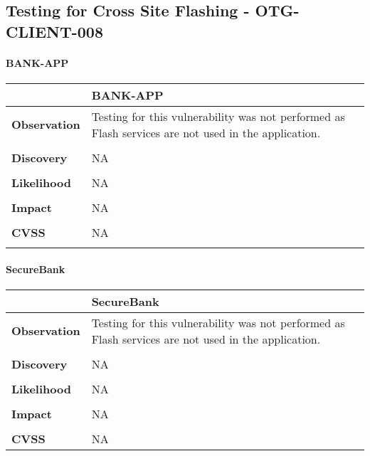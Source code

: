 \subsection{Testing for Cross Site Flashing - OTG-CLIENT-008}

\paragraph{BANK-APP} \mbox{}
\begin{longtable*}{p{.20\textwidth} | p{.75\textwidth}}
    \hline
    & \textbf{BANK-APP} \\
    \hline
    \textbf{Observation} &
     Testing for this vulnerability was not performed as Flash services are not used in the application.
    \\\\
    \textbf{Discovery} &
        NA
    \\\\
     \textbf{Likelihood} &
     NA
     \\\\
    \textbf{Impact} &
        NA
    \\\\
    \textbf{CVSS} &
     NA
     \\\\
    \hline
\end{longtable*}

\paragraph{SecureBank} \mbox{}
\begin{longtable*}{p{.20\textwidth} | p{.75\textwidth}}
    \hline
    & \textbf{SecureBank} \\
    \hline
    \textbf{Observation} &
        Testing for this vulnerability was not performed as Flash services are not used in the application.
    \\\\
    \textbf{Discovery} &
	  NA
    \\\\
    \textbf{Likelihood} &
      NA
    \\\\
    \textbf{Impact} &
      NA
    \\\\
    \textbf{CVSS} &
      NA
    \\
    \hline
\end{longtable*}
\clearpage